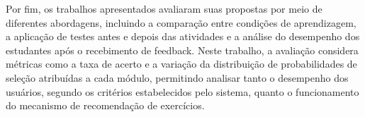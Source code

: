 Por fim, os trabalhos apresentados avaliaram suas propostas por meio de diferentes abordagens, incluindo a comparação entre condições de aprendizagem, a aplicação de 
testes antes e depois das atividades e a análise do desempenho dos estudantes após o recebimento de feedback. Neste trabalho, a avaliação considera métricas como a taxa de 
acerto e a variação da distribuição de probabilidades de seleção atribuídas a cada módulo, permitindo analisar tanto o desempenho dos usuários, segundo os critérios 
estabelecidos pelo sistema, quanto o funcionamento do mecanismo de recomendação de exercícios.